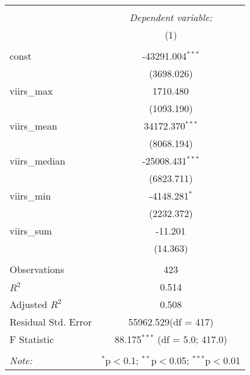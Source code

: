 \begin{table}[!htbp] \centering
\begin{tabular}{@{\extracolsep{5pt}}lc}
\\[-1.8ex]\hline
\hline \\[-1.8ex]
& \multicolumn{1}{c}{\textit{Dependent variable:}} \
\cr \cline{1-2}
\\[-1.8ex] & (1) \\
\hline \\[-1.8ex]
 const & -43291.004$^{***}$ \\
  & (3698.026) \\
 viirs_max & 1710.480$^{}$ \\
  & (1093.190) \\
 viirs_mean & 34172.370$^{***}$ \\
  & (8068.194) \\
 viirs_median & -25008.431$^{***}$ \\
  & (6823.711) \\
 viirs_min & -4148.281$^{*}$ \\
  & (2232.372) \\
 viirs_sum & -11.201$^{}$ \\
  & (14.363) \\
\hline \\[-1.8ex]
 Observations & 423 \\
 $R^2$ & 0.514 \\
 Adjusted $R^2$ & 0.508 \\
 Residual Std. Error & 55962.529(df = 417)  \\
 F Statistic & 88.175$^{***}$ (df = 5.0; 417.0) \\
\hline
\hline \\[-1.8ex]
\textit{Note:} & \multicolumn{1}{r}{$^{*}$p$<$0.1; $^{**}$p$<$0.05; $^{***}$p$<$0.01} \\
\end{tabular}
\end{table}